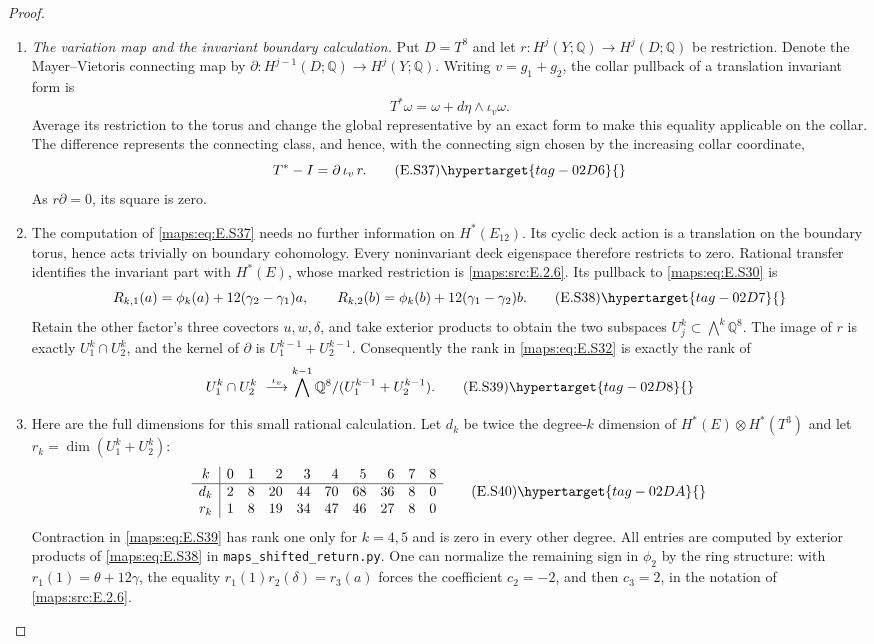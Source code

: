 \begin{proof}
\begin{enumerate}[label={$\langle1\rangle$\arabic*.},leftmargin=*]
\item \emph{The variation map and the invariant boundary calculation.}
Put $D=T^8$ and let $r:H^j(Y;\mathbb Q)\to H^j(D;\mathbb Q)$
be restriction. Denote the Mayer--Vietoris connecting map
by $\partial:H^{j-1}(D;\mathbb Q)\to H^j(Y;\mathbb Q)$.
Writing $v=g_1+g_2$, the collar pullback of a translation
invariant form is
\[
       T^*\omega=\omega+d\eta\wedge\iota_v\omega.
\]
Average its restriction to the torus and change the global
representative by an exact form to make this equality
applicable on the collar. The difference represents the
connecting class, and hence, with the connecting sign
chosen by the increasing collar coordinate,
\[
                          T^*-I=\partial\,\iota_v\,r.
 \tag{E.S37}\hypertarget{tag-02D6}{}\label{maps:eq:E.S37}
\]
As $r\partial=0$, its square is zero.

\item The computation of \eqref{maps:eq:E.S37} needs no further information on $H^*(E_{12})$. Its cyclic deck action is a translation on the
boundary torus, hence acts trivially on boundary cohomology.
Every noninvariant deck eigenspace therefore restricts to
zero. Rational transfer identifies the invariant part
with $H^*(E)$, whose marked restriction is \ref{maps:src:E.2.6}. Its
pullback to \eqref{maps:eq:E.S30} is
\[
 R_{k,1}(a)=\phi_k(a)+12(\gamma_2-\gamma_1)a,
 \qquad
 R_{k,2}(b)=\phi_k(b)+12(\gamma_1-\gamma_2)b.
 \tag{E.S38}\hypertarget{tag-02D7}{}\label{maps:eq:E.S38}
\]
Retain the other factor's three covectors $u,w,\delta$,
and take exterior products to obtain the two subspaces
$U_j^k\subset\bigwedge^k\mathbb Q^8$.
The image of $r$ is exactly $U_1^k\cap U_2^k$, and the
kernel of $\partial$ is $U_1^{k-1}+U_2^{k-1}$.
Consequently the rank in \eqref{maps:eq:E.S32} is exactly the rank of
\[
 U_1^k\cap U_2^k\ \stackrel{\iota_v}{\longrightarrow}
 \bigwedge^{k-1}\mathbb Q^8/(U_1^{k-1}+U_2^{k-1}).
 \tag{E.S39}\hypertarget{tag-02D8}{}\label{maps:eq:E.S39}
\]

\item Here are the full dimensions for this small rational
calculation. Let $d_k$ be twice the degree-$k$ dimension
of $H^*(E)\otimes H^*(T^3)$ and let
$r_k=\dim(U_1^k+U_2^k)$:
\[
 \begin{array}{c|rrrrrrrrr}
 k&0&1&2&3&4&5&6&7&8\\ \hline
 d_k&2&8&20&44&70&68&36&8&0\\
 r_k&1&8&19&34&47&46&27&8&0
 \end{array}
 \tag{E.S40}\hypertarget{tag-02DA}{}\label{maps:eq:E.S40}
\]
Contraction in \eqref{maps:eq:E.S39} has rank one only for
$k=4,5$ and is zero in every other degree. All entries
are computed by exterior products of \eqref{maps:eq:E.S38} in
\texttt{maps\_shifted\_return.py}. One can normalize the remaining sign in
$\phi_2$ by the ring structure: with
$r_1(1)=\theta+12\gamma$, the equality
$r_1(1)r_2(\delta)=r_3(a)$ forces the coefficient
$c_2=-2$, and then $c_3=2$, in the notation of \ref{maps:src:E.2.6}.




\end{enumerate}
\end{proof}
